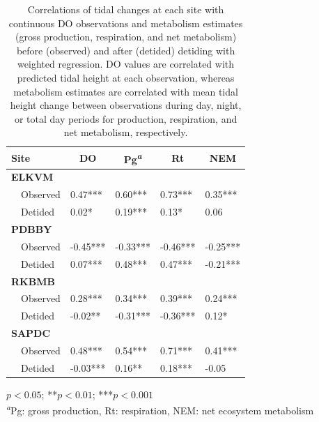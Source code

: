 \documentclass[letterpaper,12pt,oneside]{article}\usepackage[]{graphicx}\usepackage[]{color}
\begin{document}
%
\begin{table}[!tbp]
\caption{Correlations of tidal changes at each site with continuous \ac{DO} observations and metabolism estimates (gross production, respiration, and net metabolism) before (observed) and after (detided) detiding with weighted regression.  \ac{DO} values are correlated with predicted tidal height at each observation, whereas metabolism estimates are correlated with mean tidal height change between observations during day, night, or total day periods for production, respiration, and net metabolism, respectively.\label{tab:cor_res}} 
\begin{center}
\begin{tabular}{lllll}
\hline\hline
\multicolumn{1}{l}{Site}&\multicolumn{1}{c}{DO}&\multicolumn{1}{c}{Pg\textsuperscript{\textit{a}}}&\multicolumn{1}{c}{Rt}&\multicolumn{1}{c}{NEM}\tabularnewline
\hline
{\bfseries ELKVM}&&&&\tabularnewline
~~Observed& 0.47***& 0.60***& 0.73***& 0.35***\tabularnewline
~~Detided& 0.02*& 0.19***& 0.13*& 0.06 \tabularnewline
\hline
{\bfseries PDBBY}&&&&\tabularnewline
~~Observed&-0.45***&-0.33***&-0.46***&-0.25***\tabularnewline
~~Detided& 0.07***& 0.48***& 0.47***&-0.21***\tabularnewline
\hline
{\bfseries RKBMB}&&&&\tabularnewline
~~Observed& 0.28***& 0.34***& 0.39***& 0.24***\tabularnewline
~~Detided&-0.02**&-0.31***&-0.36***& 0.12*\tabularnewline
\hline
{\bfseries SAPDC}&&&&\tabularnewline
~~Observed& 0.48***& 0.54***& 0.71***& 0.41***\tabularnewline
~~Detided&-0.03***& 0.16**& 0.18***&-0.05 \tabularnewline
\hline
\end{tabular}
\end{center}
\footnotesize *$p<0.05$; **$p<0.01$; ***$p<0.001$\\\textsuperscript{\textit{a}}Pg: gross production, Rt: respiration, NEM: net ecosystem metabolism\end{table}
\end{document}
